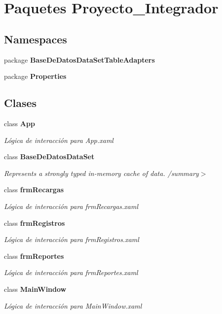 \section{Paquetes Proyecto\-\_\-\-Integrador}
\label{namespace_proyecto___integrador}
\subsection*{Namespaces}
\begin{DoxyCompactItemize}
\item 
package {\bf Base\-De\-Datos\-Data\-Set\-Table\-Adapters}
\item 
package {\bf Properties}
\end{DoxyCompactItemize}
\subsection*{Clases}
\begin{DoxyCompactItemize}
\item 
class {\bf App}
\begin{DoxyCompactList}\small\item\em Lógica de interacción para App.\-xaml \end{DoxyCompactList}\item 
class {\bf Base\-De\-Datos\-Data\-Set}
\begin{DoxyCompactList}\small\item\em Represents a strongly typed in-\/memory cache of data. /summary$>$ \end{DoxyCompactList}\item 
class {\bf frm\-Recargas}
\begin{DoxyCompactList}\small\item\em Lógica de interacción para frm\-Recargas.\-xaml \end{DoxyCompactList}\item 
class {\bf frm\-Registros}
\begin{DoxyCompactList}\small\item\em Lógica de interacción para frm\-Registros.\-xaml \end{DoxyCompactList}\item 
class {\bf frm\-Reportes}
\begin{DoxyCompactList}\small\item\em Lógica de interacción para frm\-Reportes.\-xaml \end{DoxyCompactList}\item 
class {\bf Main\-Window}
\begin{DoxyCompactList}\small\item\em Lógica de interacción para Main\-Window.\-xaml \end{DoxyCompactList}\end{DoxyCompactItemize}
